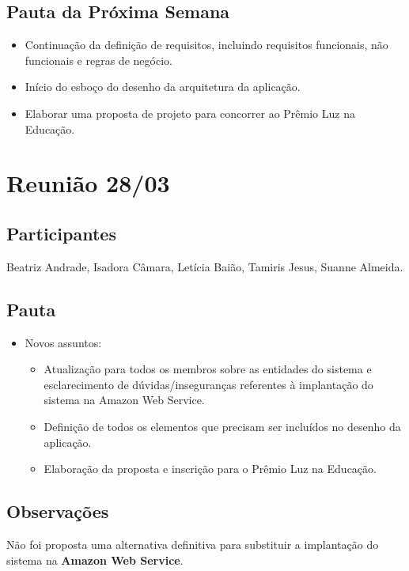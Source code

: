 \begin{apendicesenv}
\subsection*{Pauta da Próxima Semana}
\begin{itemize}
    \item Continuação da definição de requisitos, incluindo requisitos funcionais, não funcionais e regras de negócio.
    \item Início do esboço do desenho da arquitetura da aplicação.
    \item Elaborar uma proposta de projeto para concorrer ao Prêmio Luz na Educação.
\end{itemize}

\section*{Reunião 28/03}

\subsection*{Participantes}
Beatriz Andrade, Isadora Câmara, Letícia Baião, Tamiris Jesus, Suanne Almeida.

\subsection*{Pauta}
\begin{itemize}
    \item Novos assuntos:
    \begin{itemize}
        \item Atualização para todos os membros sobre as entidades do sistema e esclarecimento de dúvidas/inseguranças referentes à implantação do sistema na Amazon Web Service.
        \item Definição de todos os elementos que precisam ser incluídos no desenho da aplicação.
        \item Elaboração da proposta e inscrição para o Prêmio Luz na Educação.
    \end{itemize}
\end{itemize}

\subsection*{Observações}
Não foi proposta uma alternativa definitiva para substituir a implantação do sistema na \textbf{Amazon Web Service}.


\end{apendicesenv}

